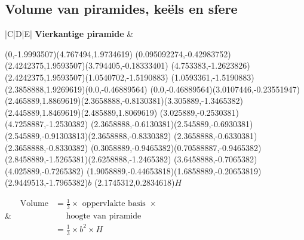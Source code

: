 \subsection{Volume van piramides, keëls en sfere}


\begin{table}[H]
\begin{tabular}{|C|D|E|}
\hline
\textbf{Vierkantige piramide}
&
\begin{center}
\scalebox{1} %
{
\begin{pspicture}(0,-1.9993507)(4.767494,1.9734619)
\pspolygon[linewidth=0.028222222,fillstyle=solid](0.095092274,-0.42983752)(2.4242375,1.9593507)(3.794405,-0.18333401)
\pspolygon[linewidth=0.028222222,fillstyle=solid](4.753383,-1.2623826)(2.4242375,1.9593507)(1.0540702,-1.5190883)
\pspolygon[linewidth=0.028222222,fillstyle=solid](1.0593361,-1.5190883)(2.3858888,1.9269619)(0.0,-0.46889564)
\psline[linewidth=0.022cm,linestyle=dashed,dash=0.16cm 0.16cm](0.0,-0.46889564)(3.0107446,-0.23551947)
\psline[linewidth=0.027999999,linestyle=dotted,dotsep=0.16cm](2.465889,1.8869619)(2.3658888,-0.8130381)(3.305889,-1.3465382)(2.445889,1.8469619)(2.485889,1.8069619)
\psline[linewidth=0.024cm,linestyle=dashed,dash=0.16cm 0.16cm](3.025889,-0.2530381)(4.7258887,-1.2530382)
\psline[linewidth=0.02](2.3658888,-0.6130381)(2.545889,-0.6930381)(2.545889,-0.91303813)(2.3658888,-0.8330382)
\psline[linewidth=0.02cm](2.3658888,-0.6330381)(2.3658888,-0.8330382)
\psline[linewidth=0.04cm](0.3058889,-0.9465382)(0.70588887,-0.9465382)
\psline[linewidth=0.04cm](2.8458889,-1.5265381)(2.6258888,-1.2465382)
\psline[linewidth=0.04cm](3.6458888,-0.7065382)(4.025889,-0.7265382)
\psline[linewidth=0.04cm](1.9058889,-0.44653818)(1.6858889,-0.20653819)
\rput(2.9449513,-1.7965382){$b$}
\rput(2.1745312,0.2834618){$H$}
\end{pspicture} 


}
\end{center} 
&
$\begin{aligned}
\mbox{ Volume} &=  \frac{1}{3} \times \mbox{ oppervlakte basis } \times\\
&~~~~~~ \mbox{hoogte van piramide }\\
&=\frac{1}{3}\times b^{2} \times H
 \end{aligned}$
\\ \hline



\end{tabular}
\end{table}
